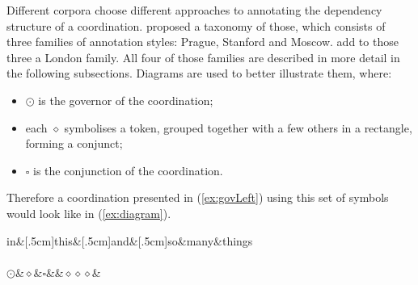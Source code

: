 Different corpora choose different approaches to annotating the dependency structure of a coordination. \cite{popel2013coordination} proposed a taxonomy of those, which consists of three families of annotation styles: Prague, Stanford and Moscow. \cite{prz:woz:23} add to those three a London family. All four of those families are described in more detail in the following subsections. Diagrams are used to better illustrate them, where:
\begin{itemize}
    \item $\odot$ is the governor of the coordination;
    \item each $\diamond$ symbolises a token, grouped together with a few others in a rectangle, forming a conjunct;
    \item $\square$ is the conjunction of the coordination.
\end{itemize}

Therefore a coordination presented in (\ref{ex:govLeft}) using this set of symbols would look like in (\ref{ex:diagram}).

\begin{exe}
    \ex
    \label{ex:diagram}
    \begin{dependency}[baseline=-\the\dimexpr\fontdimen22\textfont2\relax]
        \begin{deptext}
            in\&[.5cm]this\&[.5cm]and\&[.5cm]so\&many\&things\\
            \\
            $\odot$\&$\diamond$\&$\square$\&\&$\diamond\diamond\diamond$\&\\
        \end{deptext}
    \end{dependency}
\end{exe}






